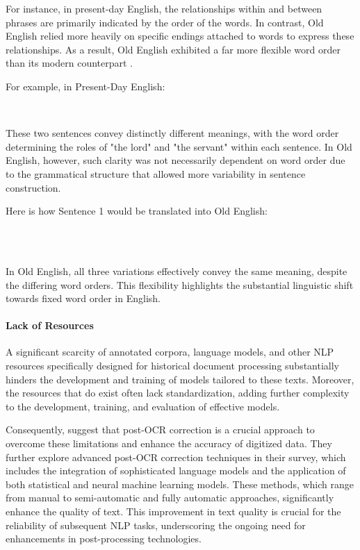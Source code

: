 For instance, in present-day English, the relationships within and between phrases are primarily indicated by the order of the words. In contrast, Old English relied more heavily on specific endings attached to words to express these relationships. As a result, Old English exhibited a far more flexible word order than its modern counterpart \citep{smith2013essentials}.

For example, in Present-Day English:

\begin{center}
\\
\end{center}

These two sentences convey distinctly different meanings, with the word order determining the roles of "the lord" and "the servant" within each sentence. In Old English, however, such clarity was not necessarily dependent on word order due to the grammatical structure that allowed more variability in sentence construction.

Here is how Sentence 1 would be translated into Old English:

\begin{center}
\\
\\
\end{center}

In Old English, all three variations effectively convey the same meaning, despite the differing word orders. This flexibility highlights the substantial linguistic shift towards fixed word order in English.


\paragraph*{Lack of Resources}
\label{par:1_lack_of_resources}
A significant scarcity of annotated corpora, language models, and other NLP resources specifically designed for historical document processing substantially hinders the development and training of models tailored to these texts. Moreover, the resources that do exist often lack standardization, adding further complexity to the development, training, and evaluation of effective models.

Consequently, \cite{nguyen2021survey} suggest that post-OCR correction is a crucial approach to overcome these limitations and enhance the accuracy of digitized data. They further explore advanced post-OCR correction techniques in their survey, which includes the integration of sophisticated language models and the application of both statistical and neural machine learning models. These methods, which range from manual to semi-automatic and fully automatic approaches, significantly enhance the quality of text. This improvement in text quality is crucial for the reliability of subsequent NLP tasks, underscoring the ongoing need for enhancements in post-processing technologies.

